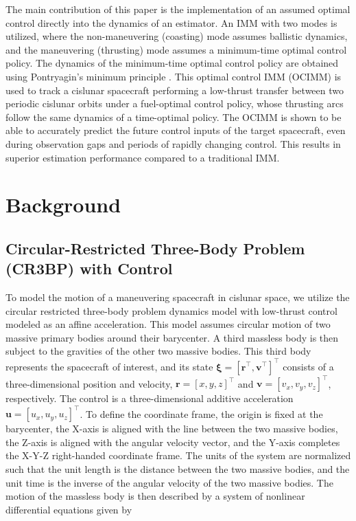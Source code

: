 \documentclass[letterpaper, preprint, paper,11pt]{AAS}	%
\begin{document}
The main contribution of this paper is the implementation of an assumed optimal control directly into the dynamics of an estimator. An IMM with two modes is utilized, where the non-maneuvering (coasting) mode assumes ballistic dynamics, and the maneuvering (thrusting) mode assumes a minimum-time optimal control policy. The dynamics of the minimum-time optimal control policy are obtained using Pontryagin's minimum principle \cite{pontryagin1962}. This optimal control IMM (OCIMM) is used to track a cislunar spacecraft performing a low-thrust transfer between two periodic cislunar orbits under a fuel-optimal control policy, whose thrusting arcs follow the same dynamics of a time-optimal policy. The OCIMM is shown to be able to accurately predict the future control inputs of the target spacecraft, even during observation gaps and periods of rapidly changing control. This results in superior estimation performance compared to a traditional IMM. 

\section{Background}

\subsection{Circular-Restricted Three-Body Problem (CR3BP) with Control}

To model the motion of a maneuvering spacecraft in cislunar space, we utilize the circular restricted three-body problem dynamics model with low-thrust control modeled as an affine acceleration. This model assumes circular motion of two massive primary bodies around their barycenter. A third massless body is then subject to the gravities of the other two massive bodies. This third body represents the spacecraft of interest, and its state $\bm{\xi} = [\bm{r}^\top, \bm{v}^\top]^\top$ consists of a three-dimensional position and velocity, $\bm{r} = [x, y, z]^\top$ and $\bm{v} = [v_x, v_y, v_z]^\top$, respectively. The control is a three-dimensional additive acceleration $\bm{u} = [u_x, u_y, u_z]^\top$. To define the coordinate frame, the origin is fixed at the barycenter, the X-axis is aligned with the line between the two massive bodies, the Z-axis is aligned with the angular velocity vector, and the Y-axis completes the X-Y-Z right-handed coordinate frame. The units of the system are normalized such that the unit length is the distance between the two massive bodies, and the unit time is the inverse of the angular velocity of the two massive bodies. The motion of the massless body is then described by a system of nonlinear differential equations given by 
\end{document}
